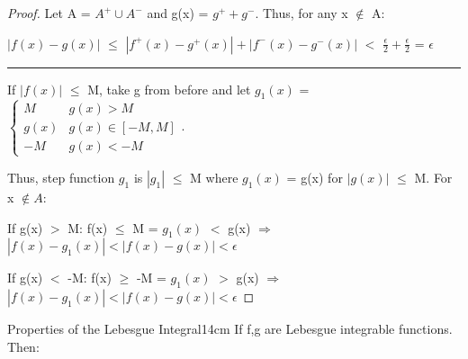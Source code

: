 \begin{proof}
        Let A = $A^+ \cup A^-$ and g(x) = $g^+ + g^-$.
        Thus, for any x $\not \in$ A:

        \hspace{0.5cm}
        $|f(x) - g(x)|$
        $\leq$ $|f^+(x) - g^+(x)| + |f^-(x) - g^-(x)|$
        $<$ $\frac{\epsilon}{2} + \frac{\epsilon}{2}$
        = $\epsilon$

        \rule[0.1cm]{15.2cm}{0.01cm}

        If $|f(x)|$ $\leq$ M, take g from before and let
        $g_1(x)$ =
        $\begin{cases}
            M & g(x) > M \\
            g(x) & g(x) \in [-M,M] \\
            -M & g(x) < -M
        \end{cases}$.

        Thus, step function $g_1$ is $|g_1|$ $\leq$ M
        where $g_1(x)$ = g(x) for $|g(x)|$ $\leq$ M. For x $\not \in A$:

        \hspace{0.2cm}
        If g(x) $>$ M:
        \hspace{0.5cm}
        f(x) $\leq$ M = $g_1(x)$ $<$ g(x)
        \hspace{0.2cm}
        $\Rightarrow$
        \hspace{0.2cm}
        $|f(x) - g_1(x)| < |f(x) - g(x)| < \epsilon$

        \hspace{0.25cm}
        If g(x) $<$ -M:
        \hspace{0.4cm}
        f(x) $\geq$ -M = $g_1(x)$ $>$ g(x)
        \hspace{0.2cm}
        $\Rightarrow$
        \hspace{0.2cm}
        $|f(x) - g_1(x)| < |f(x) - g(x)| < \epsilon$
    \end{proof}

    \newpage



    \begin{wtheorem}{Properties of the Lebesgue Integral}{14cm}
        If f,g are Lebesgue integrable functions. Then:
    \end{wtheorem}


